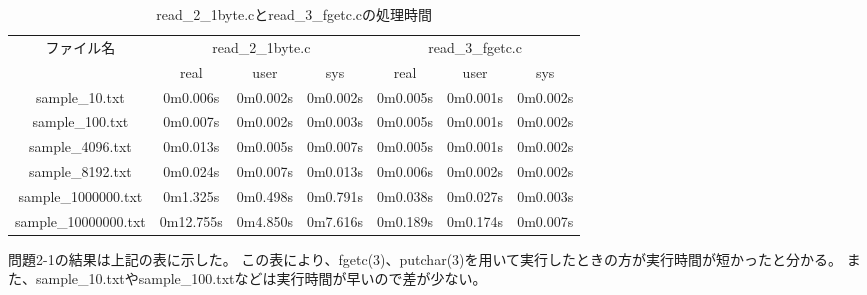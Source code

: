 \documentclass[12pt]{jarticle}
\begin{document}
\begin{table}[t]
    \caption{read\_2\_1byte.cとread\_3\_fgetc.cの処理時間}
    \begin{center}
        \begin{tabular}{|c||c|c|c|c|c|c|}
            \hline
            \multirow{2}{*}{ファイル名} & \multicolumn{3}{|c|}{read\_2\_1byte.c} & \multicolumn{3}{|c|}{read\_3\_fgetc.c}                                             \\
            \cline{2-7}
                                        & real                                   & user                                   & sys      & real     & user     & sys      \\
            \hhline{|=#===|===|}
            sample\_10.txt              & 0m0.006s                               & 0m0.002s                               & 0m0.002s & 0m0.005s & 0m0.001s & 0m0.002s \\
            \hline
            sample\_100.txt             & 0m0.007s                               & 0m0.002s                               & 0m0.003s & 0m0.005s & 0m0.001s & 0m0.002s \\
            \hline
            sample\_4096.txt            & 0m0.013s                               & 0m0.005s                               & 0m0.007s & 0m0.005s & 0m0.001s & 0m0.002s \\
            \hline
            sample\_8192.txt            & 0m0.024s                               & 0m0.007s                               & 0m0.013s & 0m0.006s & 0m0.002s & 0m0.002s \\
            \hline
            sample\_1000000.txt         & 0m1.325s                               & 0m0.498s                               & 0m0.791s & 0m0.038s & 0m0.027s & 0m0.003s \\
            \hline
            sample\_10000000.txt        & 0m12.755s                              & 0m4.850s                               & 0m7.616s & 0m0.189s & 0m0.174s & 0m0.007s \\
            \hline
        \end{tabular}
    \end{center}
    \label{tbl1}
\end{table}
問題2-1の結果は上記の表に示した。
この表により、fgetc(3)、putchar(3)を用いて実行したときの方が実行時間が短かったと分かる。
また、sample\_10.txtやsample\_100.txtなどは実行時間が早いので差が少ない。
\end{document}
